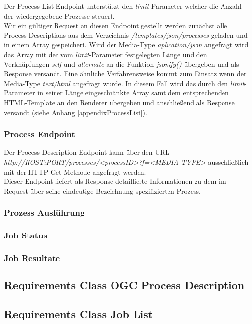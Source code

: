 Der Process List Endpoint unterstützt den \textit{limit}-Parameter welcher die Anzahl der wiedergegebene Prozesse steuert.\\ 

Wir ein gültiger Request an diesen Endpoint gestellt werden zunächst alle Process Descriptions aus dem Verzeichnis \textit{/templates/json/processes} geladen und in einem Array 
gespeichert. Wird der Media-Type \textit{aplication/json} angefragt wird das Array mit der vom \textit{limit}-Parameter festgelegten Länge und den Verknüpfungen \textit{self} und \textit{alternate} an 
die Funktion \textit{jsonify()} übergeben und als Response versandt. Eine ähnliche Verfahrensweise kommt zum Einsatz wenn der Media-Type \textit{text/html} angefragt wurde. In diesem Fall 
wird das durch den \textit{limit}-Parameter in seiner Länge eingeschränkte Array samt dem entsprechenden HTML-Template an den Renderer übergeben und anschließend als 
Response versandt (siehe Anhang \ref{appendixProcessList}).

\subsubsection{Process Endpoint}
Der Process Description Endpoint kann über den URL \textit{http://HOST:PORT/processes/<processID>?f=<MEDIA-TYPE>} ausschließlich mit der HTTP-Get Methode angefragt werden.\\

Dieser Endpoint liefert als Response detaillierte Informationen zu dem im Request über seine eindeutige Bezeichnung spezifizierten Prozess.\\ 

\subsubsection{Prozess Ausführung}
\subsubsection{Job Status}
\subsubsection{Job Resultate}
\subsection{Requirements Class OGC Process Description}
\subsection{Requirements Class Job List}
